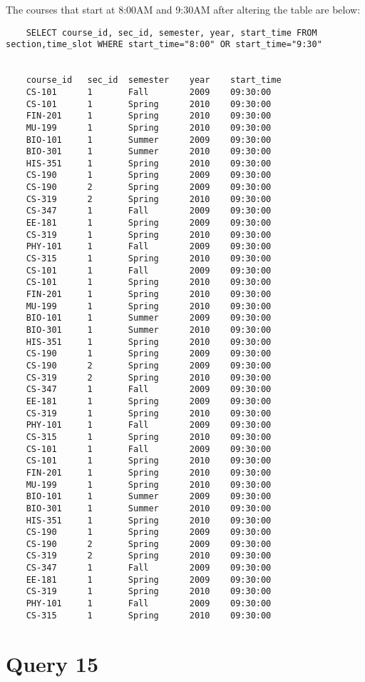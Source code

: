 \documentclass[letterpaper]{article}
\begin{document}
    The courses that start at 8:00AM and 9:30AM after altering the table are below:
    \begin{lstlisting}
    SELECT course_id, sec_id, semester, year, start_time FROM section,time_slot WHERE start_time="8:00" OR start_time="9:30"
    
    
    course_id	sec_id	semester	year	start_time	
    CS-101  	1	    Fall 	    2009	09:30:00	
    CS-101  	1	    Spring   	2010	09:30:00	
    FIN-201 	1	    Spring   	2010	09:30:00	
    MU-199  	1	    Spring   	2010	09:30:00	
    BIO-101 	1	    Summer   	2009	09:30:00	
    BIO-301 	1	    Summer   	2010	09:30:00	
    HIS-351 	1	    Spring   	2010	09:30:00	
    CS-190  	1	    Spring   	2009	09:30:00	
    CS-190  	2	    Spring   	2009	09:30:00	
    CS-319  	2	    Spring   	2010	09:30:00	
    CS-347  	1	    Fall 	    2009	09:30:00	
    EE-181  	1	    Spring   	2009	09:30:00	
    CS-319  	1	    Spring   	2010	09:30:00	
    PHY-101 	1	    Fall 	    2009	09:30:00	
    CS-315  	1	    Spring   	2010	09:30:00	
    CS-101  	1	    Fall 	    2009	09:30:00	
    CS-101  	1	    Spring   	2010	09:30:00	
    FIN-201 	1	    Spring   	2010	09:30:00	
    MU-199  	1	    Spring   	2010	09:30:00	
    BIO-101 	1	    Summer   	2009	09:30:00	
    BIO-301 	1	    Summer   	2010	09:30:00	
    HIS-351 	1	    Spring   	2010	09:30:00	
    CS-190  	1	    Spring   	2009	09:30:00	
    CS-190  	2	    Spring   	2009	09:30:00	
    CS-319  	2	    Spring   	2010	09:30:00	
    CS-347  	1	    Fall 	    2009	09:30:00	
    EE-181  	1	    Spring   	2009	09:30:00	
    CS-319  	1	    Spring   	2010	09:30:00	
    PHY-101 	1	    Fall 	    2009	09:30:00	
    CS-315  	1	    Spring   	2010	09:30:00	
    CS-101  	1	    Fall 	    2009	09:30:00	
    CS-101  	1	    Spring   	2010	09:30:00	
    FIN-201 	1	    Spring   	2010	09:30:00	
    MU-199  	1	    Spring   	2010	09:30:00	
    BIO-101 	1	    Summer   	2009	09:30:00	
    BIO-301 	1	    Summer   	2010	09:30:00	
    HIS-351 	1	    Spring   	2010	09:30:00	
    CS-190  	1	    Spring   	2009	09:30:00	
    CS-190  	2	    Spring   	2009	09:30:00	
    CS-319  	2	    Spring   	2010	09:30:00	
    CS-347  	1      	Fall	    2009	09:30:00	
    EE-181  	1      	Spring	    2009	09:30:00	
    CS-319  	1      	Spring	    2010	09:30:00	
    PHY-101 	1      	Fall	    2009	09:30:00	
    CS-315  	1      	Spring	    2010	09:30:00       
    \end{lstlisting}
        
\section{Query 15}
\end{document}
